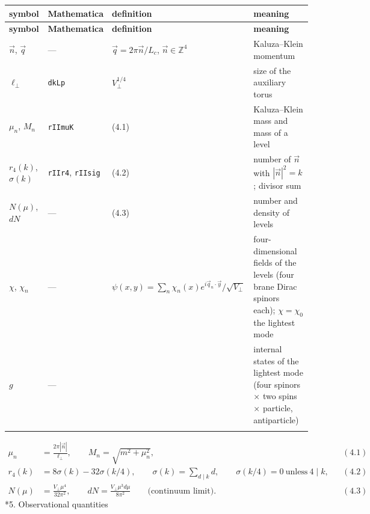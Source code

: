 \documentclass[10pt,a4paper]{article}
\makeatletter
\renewcommand\section{\@startsection{section}{1}{\z@}{-3.5ex \@plus -1ex \@minus -.2ex}{2.3ex \@plus.2ex}{\normalfont\Large\bfseries\raggedright}}
\makeatother
\begin{document}
{\small
\begin{longtable}{>{\raggedright\arraybackslash}p{}>{\raggedright\arraybackslash}p{}>{\raggedright\arraybackslash}p{}>{\raggedright\arraybackslash}p{}}
\toprule
\textbf{symbol} & \textbf{Mathematica} & \textbf{definition} & \textbf{meaning} \\
\midrule\endfirsthead
\toprule
\textbf{symbol} & \textbf{Mathematica} & \textbf{definition} & \textbf{meaning} \\
\midrule\endhead
\endfoot
\bottomrule\endlastfoot
$\vec n$, $\vec q$ & — & $\vec q=2\pi\vec n/L_c$, $\vec n\in\mathbb Z^4$ & Kaluza–Klein momentum \\
$\ell_\perp$ & \texttt{dkLp} & $V_\perp^{1/4}$ & size of the auxiliary torus \\
$\mu_n$, $M_n$ & \texttt{rIImuK} & (4.1) & Kaluza–Klein mass and mass of a level \\
$r_4(k)$, $\sigma(k)$ & \texttt{rIIr4}, \texttt{rIIsig} & (4.2) & number of $\vec n$ with $|\vec n|^2=k$; divisor sum \\
$N(\mu)$, $dN$ & — & (4.3) & number and density of levels \\
$\chi$, $\chi_n$ & — & $\psi(x,y)=\sum_n\chi_n(x)e^{i\vec q_n\cdot\vec y}/\sqrt{V_\perp}$ & four-dimensional fields of the levels (four brane Dirac spinors each); $\chi=\chi_0$ the lightest mode \\
$g$ & — & 16 & internal states of the lightest mode (four spinors × two spins × particle, antiparticle) \\*
\end{longtable}}
\begin{align*}
\mu_n&=\frac{2\pi|\vec n|}{\ell_\perp},\qquad M_n=\sqrt{m^2+\mu_n^2},&&(4.1) \\
r_4(k)&=8\sigma(k)-32\sigma(k/4),\qquad \sigma(k)=\sum_{d\mid k}d,\qquad \sigma(k/4)=0\ \text{unless}\ 4\mid k,&&(4.2) \\
N(\mu)&=\frac{V_\perp\mu^4}{32\pi^2},\qquad dN=\frac{V_\perp\mu^3d\mu}{8\pi^2}\qquad\text{(continuum limit)}.&&(4.3)
\end{align*}
\section*{5. Observational quantities}
\end{document}
